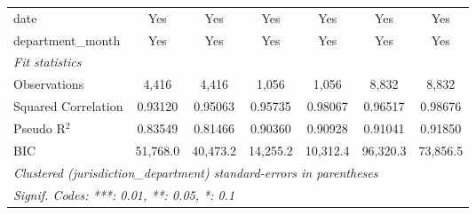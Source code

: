 \begin{tabular}{lcccccc}
   date                                            & Yes      & Yes             & Yes          & Yes             & Yes          & Yes\\  
   department\_month                               & Yes      & Yes             & Yes          & Yes             & Yes          & Yes\\  
   \midrule
   \emph{Fit statistics}\\
   Observations                                    & 4,416    & 4,416           & 1,056        & 1,056           & 8,832        & 8,832\\  
   Squared Correlation                             & 0.93120  & 0.95063         & 0.95735      & 0.98067         & 0.96517      & 0.98676\\  
   Pseudo R$^2$                                    & 0.83549  & 0.81466         & 0.90360      & 0.90928         & 0.91041      & 0.91850\\  
   BIC                                             & 51,768.0 & 40,473.2        & 14,255.2     & 10,312.4        & 96,320.3     & 73,856.5\\  
   \midrule \midrule
   \multicolumn{7}{l}{\emph{Clustered (jurisdiction\_department) standard-errors in parentheses}}\\
   \multicolumn{7}{l}{\emph{Signif. Codes: ***: 0.01, **: 0.05, *: 0.1}}\\
\end{tabular}
\par\endgroup
